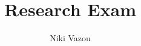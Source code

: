 \documentclass[runningheads,a4paper]{article}
\title{Research Exam}
\author{
  Niki Vazou
}
\begin{document}
\maketitle





%
%
%
%
%

{


}
\end{document}
